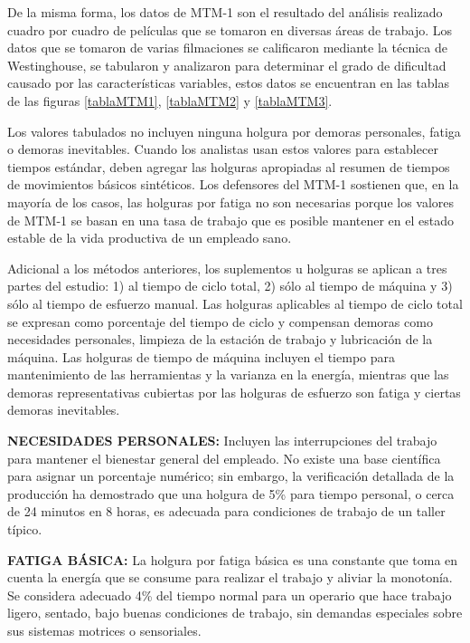     De la misma forma, los datos de MTM-1 son el resultado del análisis realizado cuadro por cuadro de películas que se tomaron en diversas áreas de trabajo. Los datos que se tomaron de varias filmaciones se calificaron mediante la técnica de Westinghouse, se tabularon y analizaron para determinar el grado de dificultad causado por las características variables, estos datos se encuentran en las tablas de las figuras \ref{tablaMTM1}, \ref{tablaMTM2} y \ref{tablaMTM3}.
    
    
    
    
    Los valores tabulados no incluyen ninguna holgura por demoras personales, fatiga o demoras inevitables. Cuando los analistas usan estos valores para establecer tiempos estándar, deben agregar las holguras apropiadas al resumen de tiempos de movimientos básicos sintéticos. Los defensores del MTM-1 sostienen que, en la mayoría de los casos, las holguras por fatiga no son necesarias porque los valores de MTM-1 se basan en una tasa de trabajo que es posible mantener en el estado estable de la vida productiva de un empleado sano.
    \cite{niebel1980ingenieria}
    
    
    Adicional a los métodos anteriores, los suplementos u holguras se aplican a tres partes del estudio: 1) al tiempo de ciclo total, 2) sólo al tiempo de máquina y 3) sólo al tiempo de esfuerzo manual. Las holguras aplicables al tiempo de ciclo total se expresan como porcentaje del tiempo de ciclo y compensan demoras como necesidades personales, limpieza de la estación de trabajo y lubricación de la máquina. Las holguras de tiempo de máquina incluyen el tiempo para mantenimiento de las herramientas y la varianza en la energía, mientras que las demoras representativas cubiertas por las holguras de esfuerzo son fatiga y ciertas demoras inevitables.
    
    
    
    \textbf{NECESIDADES PERSONALES:} Incluyen las interrupciones del trabajo para mantener el bienestar general del empleado. No existe una base científica para asignar un porcentaje numérico; sin embargo, la verificación detallada de la producción ha demostrado que una holgura de 5\% para tiempo personal, o cerca de 24 minutos en 8 horas, es adecuada para condiciones de trabajo de un taller típico. 
    
    
    
    \textbf{FATIGA BÁSICA:} La holgura por fatiga básica es una constante que toma en cuenta la energía que se consume para realizar el trabajo y aliviar la monotonía. Se considera adecuado 4\% del tiempo normal para un operario que hace trabajo ligero, sentado, bajo buenas condiciones de trabajo, sin demandas especiales sobre sus sistemas motrices o sensoriales.
    

